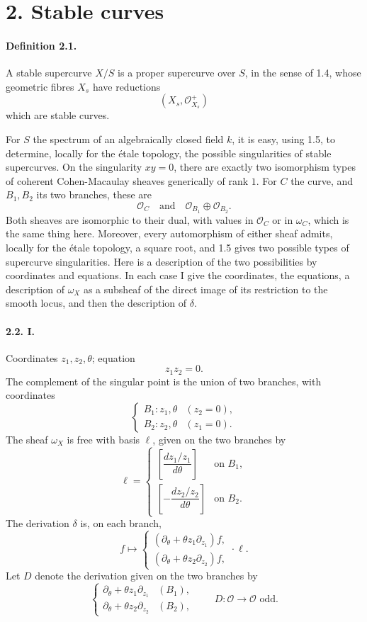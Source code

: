 \documentclass[11pt]{article}
\newcommand{\cO}{\mathcal O}
\begin{document}
\section*{2. Stable curves}

\paragraph{Definition 2.1.}
A stable supercurve $X/S$ is a proper supercurve over $S$, in the sense of 1.4, whose geometric fibres $X_s$ have reductions
\[
  (X_s,\cO^+_{X_s})
\]
which are stable curves.

For $S$ the spectrum of an algebraically closed field $k$, it is easy, using 1.5, to determine, locally for the étale topology, the possible singularities of stable supercurves. On the singularity $xy=0$, there are exactly two isomorphism types of coherent Cohen-Macaulay sheaves generically of rank $1$. For $C$ the curve, and $B_1,B_2$ its two branches, these are
\[
  \cO_C \quad\text{and}\quad \cO_{B_1}\oplus\cO_{B_2}.
\]
Both sheaves are isomorphic to their dual, with values in $\cO_C$ or in $\omega_C$, which is the same thing here. Moreover, every automorphism of either sheaf admits, locally for the étale topology, a square root, and 1.5 gives two possible types of supercurve singularities. Here is a description of the two possibilities by coordinates and equations. In each case I give the coordinates, the equations, a description of $\omega_X$ as a subsheaf of the direct image of its restriction to the smooth locus, and then the description of $\delta$.

\paragraph{2.2. I.}
Coordinates $z_1,z_2,\theta$; equation
\[
  z_1z_2=0.
\]
The complement of the singular point is the union of two branches, with coordinates
\[
  \begin{cases}
  B_1: z_1,\theta &(z_2=0),\\
  B_2: z_2,\theta &(z_1=0).
  \end{cases}
\]
The sheaf $\omega_X$ is free with basis $\ell$, given on the two branches by
\[
  \ell=\begin{cases}
  \left[\dfrac{dz_1/z_1}{d\theta}\right] &\text{on }B_1,\\[1.2ex]
  \left[-\dfrac{dz_2/z_2}{d\theta}\right] &\text{on }B_2.
  \end{cases}
\]
The derivation $\delta$ is, on each branch,
\[
  f\longmapsto
  \begin{cases}
  (\partial_\theta+\theta z_1\partial_{z_1})f,\\
  (\partial_\theta+\theta z_2\partial_{z_2})f,
  \end{cases}
  \cdot\ell.
\]
Let $D$ denote the derivation given on the two branches by
\[
  \begin{cases}
  \partial_\theta+\theta z_1\partial_{z_1} &(B_1),\\
  \partial_\theta+\theta z_2\partial_{z_2} &(B_2),
  \end{cases}
  \qquad D:\cO\to\cO\text{ odd}.
\]
\end{document}
